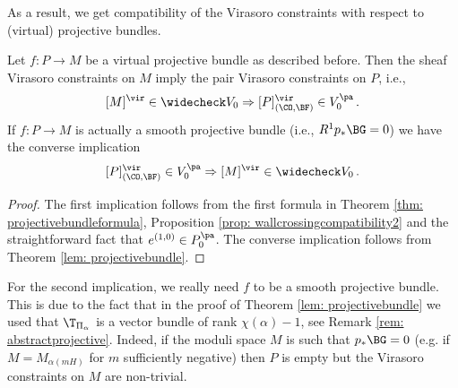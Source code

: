 As a result, we get compatibility of the Virasoro constraints with respect to (virtual) projective bundles.

\begin{corollary}
\notready\label{cor: MimpliesP}
Let $f\colon P\to M$ be a virtual projective bundle as described before. Then the sheaf Virasoro constraints on $M$ imply the pair Virasoro constraints on $P$, i.e.,
\[[M]^\vir\in \widecheck V_0\Rightarrow [P]^\vir_{(\CO,\BF)}\in  V_0^{\pa}\,.\]
If $f\colon P\to M$ is actually a smooth projective bundle (i.e., $R^1p_\ast \BG=0$) we have the converse implication
\[ [P]^\vir_{(\CO,\BF)}\in  V_0^{\pa} \Rightarrow[M]^\vir\in \widecheck V_0\,.\]
\end{corollary}
\begin{proof}
The first implication follows from the first formula in Theorem \ref{thm: projectivebundleformula}, Proposition \ref{prop: wallcrossingcompatibility2} and the straightforward fact that $e^{(1,0)}\in P_0^{\pa}$. The converse implication follows from Theorem \ref{lem: projectivebundle}.\qedhere
\end{proof}

\begin{remark}
\notready
For the second implication, we really need $f$ to be a smooth projective bundle. This is due to the fact that in the proof of Theorem \ref{lem: projectivebundle} we used that $\T_{\Pi_\alpha}$ is a vector bundle of rank $\chi(\alpha)-1$, see Remark \ref{rem: abstractprojective}. Indeed, if the moduli space $M$ is such that $p_\ast \BG=0$ (e.g. if $M=M_{\alpha(mH)}$ for $m$ sufficiently negative) then $P$ is empty but the Virasoro constraints on $M$ are non-trivial.
\end{remark}






